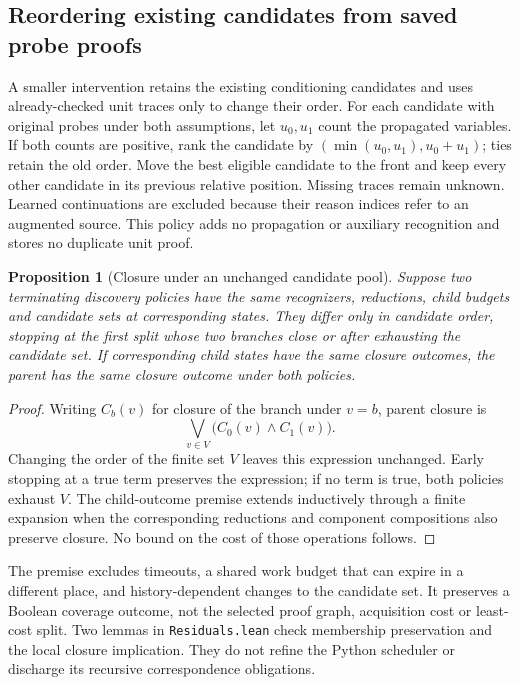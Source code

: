 \documentclass[11pt,a4paper]{article}
\numberwithin{equation}{section}
\theoremstyle{plain}
\newtheorem{proposition}[lemma]{Proposition}
\theoremstyle{definition}
\theoremstyle{remark}
\begin{document}
\subsection{Reordering existing candidates from saved probe proofs}
\label{sec:probe-rank}

A smaller intervention retains the existing conditioning candidates and uses already-checked unit traces only to change their order. For each candidate with original probes under both assumptions, let $u_0,u_1$ count the propagated variables. If both counts are positive, rank the candidate by $(\min(u_0,u_1),u_0+u_1)$; ties retain the old order. Move the best eligible candidate to the front and keep every other candidate in its previous relative position. Missing traces remain unknown. Learned continuations are excluded because their reason indices refer to an augmented source. This policy adds no propagation or auxiliary recognition and stores no duplicate unit proof.

\begin{proposition}[Closure under an unchanged candidate pool]
\label{prop:conditioning-pool-closure}
Suppose two terminating discovery policies have the same recognizers, reductions, child budgets and candidate sets at corresponding states. They differ only in candidate order, stopping at the first split whose two branches close or after exhausting the candidate set. If corresponding child states have the same closure outcomes, the parent has the same closure outcome under both policies.
\end{proposition}
\begin{proof}
Writing $C_b(v)$ for closure of the branch under $v=b$, parent closure is
\[
  \bigvee_{v\in V}\bigl(C_0(v)\land C_1(v)\bigr).
\]
Changing the order of the finite set $V$ leaves this expression unchanged. Early stopping at a true term preserves the expression; if no term is true, both policies exhaust $V$. The child-outcome premise extends inductively through a finite expansion when the corresponding reductions and component compositions also preserve closure. No bound on the cost of those operations follows.
\end{proof}

The premise excludes timeouts, a shared work budget that can expire in a different place, and history-dependent changes to the candidate set. It preserves a Boolean coverage outcome, not the selected proof graph, acquisition cost or least-cost split. Two lemmas in \texttt{Residuals.lean} check membership preservation and the local closure implication. They do not refine the Python scheduler or discharge its recursive correspondence obligations.
\end{document}
